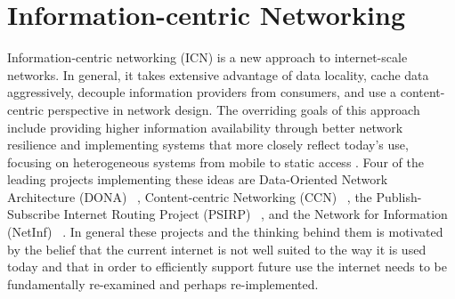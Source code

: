 \section{Information-centric Networking}
\label{section:information-centric-networking}
Information-centric networking (ICN) is a new approach to internet-scale networks.  In general, it takes extensive advantage of data locality, cache data aggressively, decouple information providers from consumers, and use a content-centric perspective in network design. The overriding goals of this approach include providing higher information availability through better network resilience and implementing systems that more closely reflect today's use, focusing on heterogeneous systems from mobile to static access \cite{6231276}.  Four of the leading projects implementing these ideas are Data-Oriented Network Architecture (DONA) ~\cite{Koponen:2007:DNA:1282427.1282402}, Content-centric Networking (CCN) ~\cite{NDN,CCNx}, the Publish-Subscribe Internet Routing Project (PSIRP) ~\cite{PSIRP}, and the Network for Information (NetInf) ~\cite{NetInf}.  In general these projects and the thinking behind them is motivated by the belief that the current internet is not well suited to the way it is used today and that in order to efficiently support future use the internet needs to be fundamentally re-examined and perhaps re-implemented.

